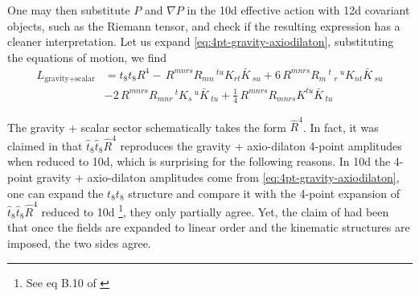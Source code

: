 One may then substitute $P$ and $\nabla P$ in the 10d effective action with 12d covariant objects, such as the Riemann tensor, and check if the resulting expression has a cleaner interpretation.
Let us expand \eqref{eq:4pt-gravity-axiodilaton}, substituting the equations of motion, we find
\begin{equation}
\begin{aligned}
L_{\text{gravity+scalar}} 
&= t_8t_8 R^4
-\,R^{m n r s} R_{m n}\,^{t u} K_{r t} \bar{K}\,_{s u}
+6\,R^{m n r s} R_{m}\,^{t}\,_{r}\,^{u} K_{n t} \bar{K}\,_{s u}\\
&-2\,R^{m n r s} R_{m n r}\,^{t} K_{s}\,^{u} \bar{K}\,_{t u}
+\frac{1}{4}\,R^{m n r s} R_{m n r s} K^{t u} \bar{K}\,_{t u}
\label{eq:4pt-gravity-axiodilaton-expanded}
\end{aligned}
\end{equation}



The gravity + scalar sector schematically takes the form $\hat{R}^4$.
In fact, it was claimed in \cite{Minasian:2015bxa} that $\hat{t}_8\hat{t}_8 \hat{R}^4$ reproduces the gravity + axio-dilaton 4-point amplitudes when reduced to 10d, which is surprising for the following reasons.
In 10d the 4-point gravity + axio-dilaton amplitudes come from \eqref{eq:4pt-gravity-axiodilaton}, one can expand the $t_8t_8$ structure and compare it with the 4-point expansion of $\hat{t}_8 \hat{t}_8 \hat{R}^4$ reduced to 10d \footnote{See eq B.10 of \cite{Minasian:2015bxa}}, they only partially agree.
Yet, the claim of \cite{Minasian:2015bxa} had been that once the fields are expanded to linear order and the kinematic structures are imposed, the two sides agree.

